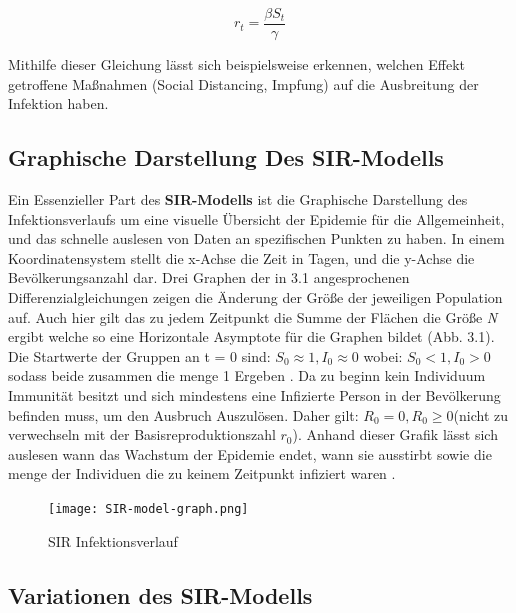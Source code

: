 \documentclass[12pt]{scrartcl} %
\begin{document}
$$ r_{t} = \frac{\beta S_{t}}{\gamma} $$

Mithilfe dieser Gleichung lässt sich beispielsweise erkennen, welchen Effekt getroffene Maßnahmen (Social Distancing, Impfung) auf die Ausbreitung der Infektion haben.


\subsection{Graphische Darstellung Des SIR-Modells}

Ein Essenzieller Part des \textbf{SIR-Modells} ist die Graphische Darstellung des Infektionsverlaufs um eine visuelle Übersicht der Epidemie für die Allgemeinheit, und das schnelle auslesen von Daten an spezifischen Punkten zu haben.
In einem Koordinatensystem stellt die x-Achse die Zeit in Tagen, und die y-Achse die Bevölkerungsanzahl dar. Drei Graphen der in 3.1 angesprochenen Differenzialgleichungen zeigen die Änderung der Größe der jeweiligen Population auf.
Auch hier gilt das zu jedem Zeitpunkt die Summe der Flächen die Größe \textit{N} ergibt welche so eine Horizontale Asymptote für die Graphen bildet (Abb. 3.1).
Die Startwerte der Gruppen an t = 0 sind: 
$S_{0} \approx 1, I_{0} \approx 0$ wobei: $ S_{0} < 1, I_{0} > 0$ sodass beide zusammen die menge 1 Ergeben \cite{4}.
Da zu beginn kein Individuum Immunität besitzt und sich mindestens eine Infizierte Person in der Bevölkerung befinden muss, um den Ausbruch Auszulösen. Daher gilt: $R_{0} = 0, R_{0} \geq 0 $(nicht zu verwechseln mit der Basisreproduktionszahl $r_{0}$).
Anhand dieser Grafik lässt sich auslesen wann das Wachstum der Epidemie endet, wann sie ausstirbt sowie die menge der Individuen die zu keinem Zeitpunkt infiziert waren \cite{1}.

	\begin{figure}[h]
	\centering
	\texttt{[image: SIR-model-graph.png]}
	\caption[SIR Infektionsverlauf,\newline https://www.davidketcheson.info/2020/03/17/SIR\textunderscore model.html]{SIR Infektionsverlauf}
	\end{figure}


\subsection{Variationen des SIR-Modells}
\end{document}
